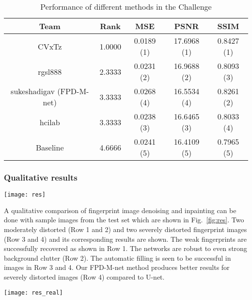 \documentclass{llncs}
\begin{document}
\vspace{-0.3cm}
\begin{table}[h!]
\centering
\addtolength{\tabcolsep}{8pt}
\begin{tabular}{ c | c | c | c | c }
    \hline \hline
    Team          & Rank    & MSE        & PSNR        & SSIM   \\ \hline \hline
    CVxTz        & 1.0000  & 0.0189 (1) & 17.6968 (1) & 0.8427 (1) \\
    rgsl888      & 2.3333  & 0.0231 (2) & 16.9688 (2) & 0.8093 (3) \\
    sukeshadigav (FPD-M-net) & 3.3333  & 0.0268 (4) & 16.5534 (4) & 0.8261 (2) \\
    hcilab       & 3.3333  & 0.0238 (3) & 16.6465 (3) & 0.8033 (4) \\
    Baseline 	 & 4.6666  & 0.0241 (5)	& 16.4109 (5) & 0.7965 (5) \\
    \hline\hline
\end{tabular}
\caption{Performance of different methods in the Challenge}
\label{table:chal}
\end{table}

\subsubsection{Qualitative results}
\label{sssec:qualitative}

\begin{figure*}[h!]
    \centering
    \texttt{[image: res]}
    \caption{Illustration of fingerprint denoising and inpainting results for varying distorted images. From left to right: distorted fingerprints, corresponding ground-truth, results of U-net, our methods FPD-M-net-A and FPD-M-net-B}
    \label{fig:res}
\end{figure*}

A qualitative comparison of fingerprint image denoising and inpainting can be done with sample images from the test set which are shown in Fig.~\ref{fig:res}. Two moderately distorted (Row 1 and 2) and two severely distorted fingerprint images (Row 3 and 4) and its corresponding results are shown. The weak fingerprints are successfully recovered as shown in Row 1. The networks are robust to even strong background clutter (Row 2). The automatic filling is seen to be successful in images in Row 3 and 4. Our FPD-M-net method produces better results for severely distorted images (Row 4) compared to U-net.

\begin{figure*}[t!]
    \centering
    \texttt{[image: res\_real]}
    \caption{Sample results of fingerprint denoising and inpainting on real images. From left to right: distorted fingerprints, results of U-net, our methods FPD-M-net-A and FPD-M-net-B}
    \label{fig:res2}
\end{figure*}
\end{document}
